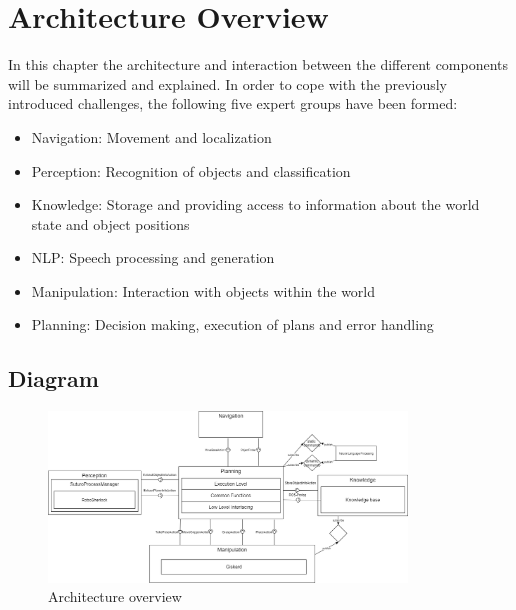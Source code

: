 \documentclass[main.tex]{subfiles}
\begin{document}
	\begingroup

	\renewcommand{\cleardoublepage}{}

	\renewcommand{\clearpage}{}

	\chapter{Architecture Overview}
		In this chapter the architecture and interaction between the different components will be summarized and explained.
		In order to cope with the previously introduced challenges, the following five expert groups have been formed:

		\begin{itemize}
			\item Navigation: Movement and localization
			\item Perception: Recognition of objects and classification
			\item Knowledge: Storage and providing access to information about the world state and object positions
			\item NLP: Speech processing and generation
			\item Manipulation: Interaction with objects within the world
			\item Planning: Decision making, execution of plans and error handling
		\end{itemize}
		
		\section{Diagram}
		
		\begin{figure}[h]
			\centering
			\includegraphics[width=0.85\textwidth]{pictures/diagramms/architecture.png}
			\caption{Architecture overview}
			\label{architecture}
		\end{figure}
		
\end{document}

